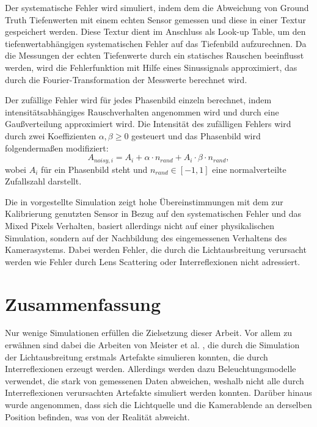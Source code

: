 \documentclass[thesis.tex]{subfiles}
\begin{document}
Der systematische Fehler wird simuliert, indem dem die Abweichung von Ground Truth Tiefenwerten mit einem echten Sensor gemessen und diese in einer Textur gespeichert werden. Diese Textur dient im Anschluss als Look-up Table, um den tiefenwertabhängigen systematischen Fehler auf das Tiefenbild aufzurechnen. Da die Messungen der echten Tiefenwerte durch ein statisches Rauschen beeinflusst werden, wird die Fehlerfunktion mit Hilfe eines Sinussignals approximiert, das durch die Fourier-Transformation der Messwerte berechnet wird.

Der zufällige Fehler wird für jedes Phasenbild einzeln berechnet, indem intensitätsabhängiges Rauschverhalten angenommen wird und durch eine Gaußverteilung approximiert wird. Die Intensität des zufälligen Fehlers wird durch zwei Koeffizienten $\alpha, \beta \geq 0$ gesteuert und das Phasenbild wird folgendermaßen modifiziert:
\begin{equation}
A_{noisy,i} = A_i + \alpha \cdot n_{rand} + A_i \cdot \beta \cdot n_{rand},
\end{equation}
wobei $A_i$ für ein Phasenbild steht und $n_{rand} \in [-1,1]$ eine normalverteilte Zufallszahl darstellt.

Die in \cite{bib:Keller2015} vorgestellte Simulation zeigt hohe Übereinstimmungen mit dem zur Kalibrierung genutzten Sensor in Bezug auf den systematischen Fehler und das Mixed Pixels Verhalten, basiert allerdings nicht auf einer physikalischen Simulation, sondern auf der Nachbildung des eingemessenen Verhaltens des Kamerasystems. Dabei werden Fehler, die durch die Lichtausbreitung verursacht werden wie Fehler durch Lens Scattering oder Interreflexionen nicht adressiert.

\section{Zusammenfassung}

Nur wenige Simulationen erfüllen die Zielsetzung dieser Arbeit. Vor allem zu erwähnen sind dabei die Arbeiten von Meister et al. \cite{bib:Meister2012PhotonMB}\cite{bib:Meister2013}, die durch die Simulation der Lichtausbreitung erstmals Artefakte simulieren konnten, die durch Interreflexionen erzeugt werden. Allerdings werden dazu Beleuchtungsmodelle verwendet, die stark von gemessenen Daten abweichen, weshalb nicht alle durch Interreflexionen verursachten Artefakte simuliert werden konnten. Darüber hinaus wurde angenommen, dass sich die Lichtquelle und die Kamerablende an derselben Position befinden, was von der Realität abweicht. 
\end{document}
